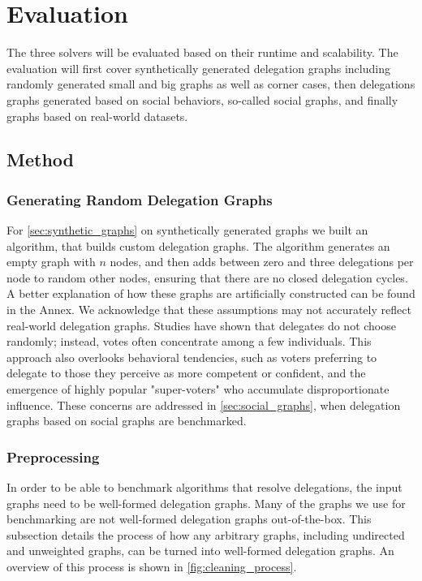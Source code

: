\graphicspath{ {./figures/} }

\chapter{Evaluation}
\label{chap:evaluation}

The three solvers will be evaluated based on their runtime and scalability. The evaluation will first cover synthetically generated delegation graphs including randomly generated small and big graphs as well as corner cases, then delegations graphs generated based on social behaviors, so-called social graphs, and finally graphs based on real-world datasets.

\section{Method}

\subsection{Generating Random Delegation Graphs}

For \cref{sec:synthetic_graphs} on synthetically generated graphs we built an algorithm, that builds custom delegation graphs. The algorithm generates an empty graph with $n$ nodes, and then adds between zero and three delegations per node to random other nodes, ensuring that there are no closed delegation cycles. A better explanation of how these graphs are artificially constructed can be found in the Annex.  We acknowledge that these assumptions may not accurately reflect real-world delegation graphs. Studies have shown that delegates do not choose randomly; instead, votes often concentrate among a few individuals. This approach also overlooks behavioral tendencies, such as voters preferring to delegate to those they perceive as more competent or confident, and the emergence of highly popular "super-voters" who accumulate disproportionate influence. \cite{klingVotingBehaviourPower2015} These concerns are addressed in \cref{sec:social_graphs}, when delegation graphs based on social graphs are benchmarked. 

\subsection{Preprocessing}

In order to be able to benchmark algorithms that resolve delegations, the input graphs need to be well-formed delegation graphs. Many of the graphs we use for benchmarking are not well-formed delegation graphs out-of-the-box. This subsection details the process of how any arbitrary graphs, including undirected and unweighted graphs, can be turned into well-formed delegation graphs. An overview of this process is shown in \cref{fig:cleaning_process}.

